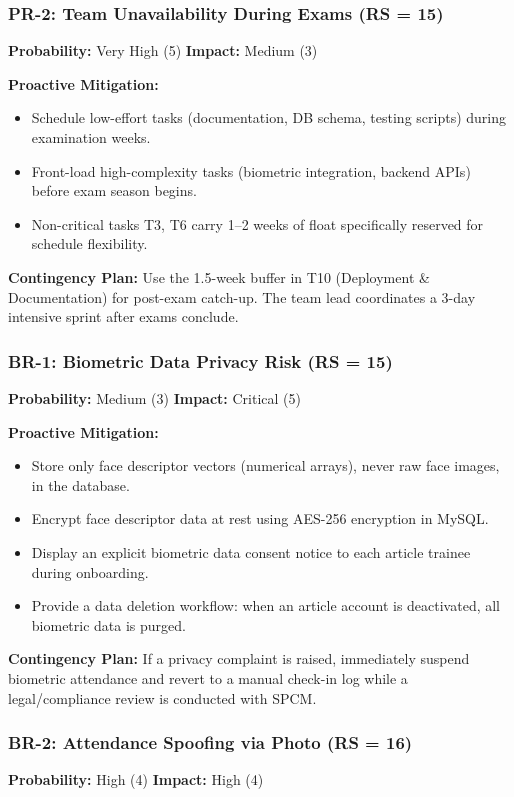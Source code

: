 \documentclass[12pt,a4paper]{article}
\begin{document}
\bigskip
\subsubsection*{PR-2: Team Unavailability During Exams (RS = 15)}
\textbf{Probability:} Very High (5) \quad \textbf{Impact:} Medium (3)

\textbf{Proactive Mitigation:}
\begin{itemize}[noitemsep]
    \item Schedule low-effort tasks (documentation, DB schema, testing scripts) during examination weeks.
    \item Front-load high-complexity tasks (biometric integration, backend APIs) before exam season begins.
    \item Non-critical tasks T3, T6 carry 1--2 weeks of float specifically reserved for schedule flexibility.
\end{itemize}

\textbf{Contingency Plan:}
Use the 1.5-week buffer in T10 (Deployment \& Documentation) for post-exam catch-up. The team lead coordinates a 3-day intensive sprint after exams conclude.

\bigskip
\subsubsection*{BR-1: Biometric Data Privacy Risk (RS = 15)}
\textbf{Probability:} Medium (3) \quad \textbf{Impact:} Critical (5)

\textbf{Proactive Mitigation:}
\begin{itemize}[noitemsep]
    \item Store only face descriptor vectors (numerical arrays), never raw face images, in the database.
    \item Encrypt face descriptor data at rest using AES-256 encryption in MySQL.
    \item Display an explicit biometric data consent notice to each article trainee during onboarding.
    \item Provide a data deletion workflow: when an article account is deactivated, all biometric data is purged.
\end{itemize}

\textbf{Contingency Plan:}
If a privacy complaint is raised, immediately suspend biometric attendance and revert to a manual check-in log while a legal/compliance review is conducted with SPCM.

\bigskip
\subsubsection*{BR-2: Attendance Spoofing via Photo (RS = 16)}
\textbf{Probability:} High (4) \quad \textbf{Impact:} High (4)
\end{document}
